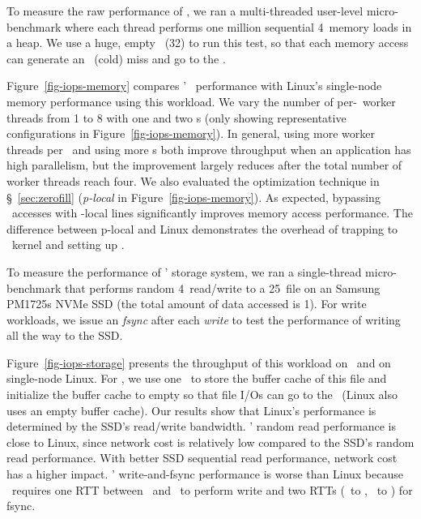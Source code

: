 \documentclass[10pt,times,twocolumn]{z2-article}
\begin{document}
{{{{{{{
To measure the raw performance of \mcomponent, we ran a multi-threaded user-level micro-benchmark 
where each thread performs one million sequential 4\KB\ memory loads in a heap.
We use a huge, empty \excache\ (32\GB) to run this test, 
so that each memory access can generate an \excache\ (cold) miss and go to the \mcomponent.

Figure~\ref{fig-iops-memory} compares \lego' \mcomponent\ performance 
with Linux's single-node memory performance using this workload.
We vary the number of per-\mcomponent\ worker threads from 1 to 8 
with one and two \mcomponent{}s (only showing representative configurations in Figure~\ref{fig-iops-memory}).
In general, using more worker threads per \mcomponent\ and using more \mcomponent{}s both improve throughput when an application has high parallelism,
but the improvement largely reduces after the total number of worker threads reach four.
We also evaluated the optimization technique in \S~\ref{sec:zerofill} ({\em p-local} in Figure~\ref{fig-iops-memory}).
As expected, bypassing \mcomponent\ accesses with \pcomponent-local lines significantly 
improves memory access performance.
The difference between p-local and Linux demonstrates the overhead of trapping to \lego\ kernel and setting up \excache.

To measure the performance of \lego' storage system, we ran a single-thread micro-benchmark 
that performs random 4\KB\ read/write to a 25\GB\ file on an Samsung PM1725s NVMe SSD (the total amount of data accessed is 1\GB).
For write workloads, we issue an {\em fsync} after each {\em write} to test the performance of writing all the way to the SSD.

Figure~\ref{fig-iops-storage} presents the throughput of this workload on \lego\ and on single-node Linux.
For \lego, we use one \mcomponent\ to store the buffer cache of this file and initialize the buffer cache to empty
so that file I/Os can go to the \scomponent\ (Linux also uses an empty buffer cache).
Our results show that Linux's performance is determined by the SSD's read/write bandwidth.
\lego' random read performance is close to Linux, since network cost is relatively low compared to the SSD's random read performance.
With better SSD sequential read performance, network cost has a higher impact.
\lego' write-and-fsync performance is worse than Linux because
\lego\ requires one RTT between \pcomponent\ and \mcomponent\ to perform write 
and two RTTs (\pcomponent\ to \mcomponent, \mcomponent\ to \scomponent) for fsync.

}}}}}}}
\end{document}
